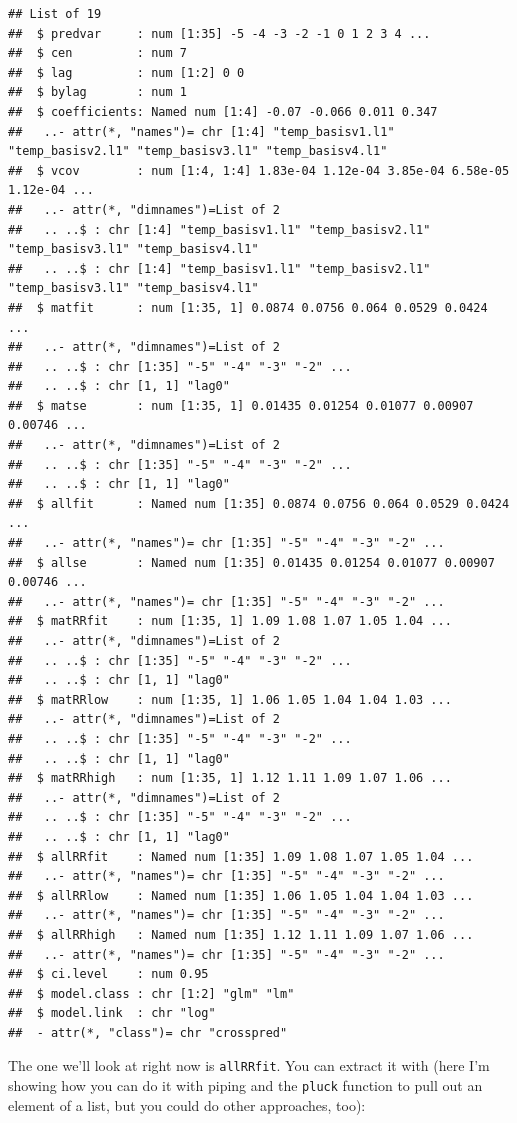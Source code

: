 \documentclass[
]{book}
\begin{document}
\begin{verbatim}
## List of 19
##  $ predvar     : num [1:35] -5 -4 -3 -2 -1 0 1 2 3 4 ...
##  $ cen         : num 7
##  $ lag         : num [1:2] 0 0
##  $ bylag       : num 1
##  $ coefficients: Named num [1:4] -0.07 -0.066 0.011 0.347
##   ..- attr(*, "names")= chr [1:4] "temp_basisv1.l1" "temp_basisv2.l1" "temp_basisv3.l1" "temp_basisv4.l1"
##  $ vcov        : num [1:4, 1:4] 1.83e-04 1.12e-04 3.85e-04 6.58e-05 1.12e-04 ...
##   ..- attr(*, "dimnames")=List of 2
##   .. ..$ : chr [1:4] "temp_basisv1.l1" "temp_basisv2.l1" "temp_basisv3.l1" "temp_basisv4.l1"
##   .. ..$ : chr [1:4] "temp_basisv1.l1" "temp_basisv2.l1" "temp_basisv3.l1" "temp_basisv4.l1"
##  $ matfit      : num [1:35, 1] 0.0874 0.0756 0.064 0.0529 0.0424 ...
##   ..- attr(*, "dimnames")=List of 2
##   .. ..$ : chr [1:35] "-5" "-4" "-3" "-2" ...
##   .. ..$ : chr [1, 1] "lag0"
##  $ matse       : num [1:35, 1] 0.01435 0.01254 0.01077 0.00907 0.00746 ...
##   ..- attr(*, "dimnames")=List of 2
##   .. ..$ : chr [1:35] "-5" "-4" "-3" "-2" ...
##   .. ..$ : chr [1, 1] "lag0"
##  $ allfit      : Named num [1:35] 0.0874 0.0756 0.064 0.0529 0.0424 ...
##   ..- attr(*, "names")= chr [1:35] "-5" "-4" "-3" "-2" ...
##  $ allse       : Named num [1:35] 0.01435 0.01254 0.01077 0.00907 0.00746 ...
##   ..- attr(*, "names")= chr [1:35] "-5" "-4" "-3" "-2" ...
##  $ matRRfit    : num [1:35, 1] 1.09 1.08 1.07 1.05 1.04 ...
##   ..- attr(*, "dimnames")=List of 2
##   .. ..$ : chr [1:35] "-5" "-4" "-3" "-2" ...
##   .. ..$ : chr [1, 1] "lag0"
##  $ matRRlow    : num [1:35, 1] 1.06 1.05 1.04 1.04 1.03 ...
##   ..- attr(*, "dimnames")=List of 2
##   .. ..$ : chr [1:35] "-5" "-4" "-3" "-2" ...
##   .. ..$ : chr [1, 1] "lag0"
##  $ matRRhigh   : num [1:35, 1] 1.12 1.11 1.09 1.07 1.06 ...
##   ..- attr(*, "dimnames")=List of 2
##   .. ..$ : chr [1:35] "-5" "-4" "-3" "-2" ...
##   .. ..$ : chr [1, 1] "lag0"
##  $ allRRfit    : Named num [1:35] 1.09 1.08 1.07 1.05 1.04 ...
##   ..- attr(*, "names")= chr [1:35] "-5" "-4" "-3" "-2" ...
##  $ allRRlow    : Named num [1:35] 1.06 1.05 1.04 1.04 1.03 ...
##   ..- attr(*, "names")= chr [1:35] "-5" "-4" "-3" "-2" ...
##  $ allRRhigh   : Named num [1:35] 1.12 1.11 1.09 1.07 1.06 ...
##   ..- attr(*, "names")= chr [1:35] "-5" "-4" "-3" "-2" ...
##  $ ci.level    : num 0.95
##  $ model.class : chr [1:2] "glm" "lm"
##  $ model.link  : chr "log"
##  - attr(*, "class")= chr "crosspred"
\end{verbatim}

The one we'll look at right now is \texttt{allRRfit}. You can extract it with (here I'm showing
how you can do it with piping and the \texttt{pluck} function to pull out an element of a list,
but you could do other approaches, too):
\end{document}
